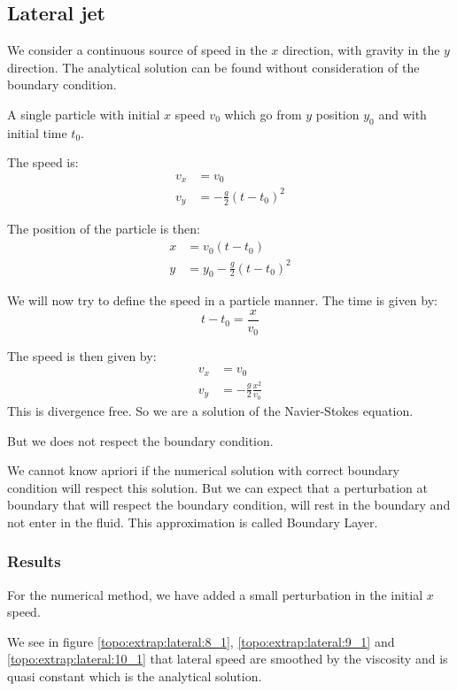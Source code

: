 \subsection{Lateral jet}

We consider a continuous source of speed in the $x$ direction, with gravity in the $y$ direction.
The analytical solution can be found without consideration of the boundary condition.

A single particle with initial $x$ speed $v_{0}$ which go from $y$ position $y_0$ and with initial time $t_0$.

The speed is:
\begin{align}
	v_{x}&=v_{0}\\
	v_{y}&=-\frac{g}{2}(t-t_0)^2
\end{align}

The position of the particle is then:
\begin{align}
	x&=v_{0}(t-t_0)\\
	y&=y_0-\frac{g}{2}(t-t_0)^2
\end{align}

We will now try to define the speed in a particle manner.
The time is given by:
\begin{equation}
	t-t_{0}=\frac{x}{v_{0}}
\end{equation}

The speed is then given by:
\begin{align}
	v_{x}&=v_{0}\\
	v_{y}&=-\frac{g}{2}\frac{x^2}{v_{0}}
\end{align}
This is divergence free.
So we are a solution of the Navier-Stokes equation.

But we does not respect the boundary condition.

We cannot know apriori if the numerical solution with correct boundary condition will respect this solution.
But we can expect that a perturbation at boundary that will respect the boundary condition,
will rest in the boundary and not enter in the fluid.
This approximation is called Boundary Layer.


\subsubsection{Results}


For the numerical method, we have added a small perturbation in the initial $x$ speed.

We see in figure \ref{topo:extrap:lateral:8_1}, \ref{topo:extrap:lateral:9_1} and \ref{topo:extrap:lateral:10_1} that lateral
speed are smoothed by the viscosity and is quasi constant which is the analytical solution.

